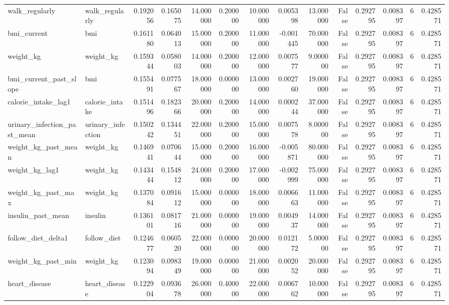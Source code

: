 \begin{longtable}{llrrrrrrrrrrrr}
walk\_regularly & walk\_regularly & 0.192056 & 0.165075 & 14.000000 & 0.200000 & 10.000000 & 0.005398 & 13.000000 & False & 0.292795 & 0.008397 & 6 & 0.428571 \\
bmi\_current & bmi & 0.161180 & 0.064013 & 15.000000 & 0.200000 & 11.000000 & -0.001445 & 70.000000 & False & 0.292795 & 0.008397 & 6 & 0.428571 \\
weight\_kg & weight\_kg & 0.159344 & 0.058003 & 14.000000 & 0.200000 & 12.000000 & 0.007577 & 9.000000 & False & 0.292795 & 0.008397 & 6 & 0.428571 \\
bmi\_current\_past\_slope & bmi & 0.155491 & 0.077567 & 18.000000 & 0.000000 & 13.000000 & 0.002760 & 19.000000 & False & 0.292795 & 0.008397 & 6 & 0.428571 \\
calorie\_intake\_lag1 & calorie\_intake & 0.151496 & 0.182366 & 20.000000 & 0.200000 & 14.000000 & 0.000244 & 37.000000 & False & 0.292795 & 0.008397 & 6 & 0.428571 \\
urinary\_infection\_past\_mean & urinary\_infection & 0.150242 & 0.134451 & 22.000000 & 0.200000 & 15.000000 & 0.007578 & 8.000000 & False & 0.292795 & 0.008397 & 6 & 0.428571 \\
weight\_kg\_past\_mean & weight\_kg & 0.146941 & 0.070644 & 15.000000 & 0.200000 & 16.000000 & -0.005871 & 80.000000 & False & 0.292795 & 0.008397 & 6 & 0.428571 \\
weight\_kg\_lag1 & weight\_kg & 0.143444 & 0.154812 & 24.000000 & 0.200000 & 17.000000 & -0.002999 & 75.000000 & False & 0.292795 & 0.008397 & 6 & 0.428571 \\
weight\_kg\_past\_max & weight\_kg & 0.137084 & 0.091612 & 15.000000 & 0.000000 & 18.000000 & 0.006663 & 11.000000 & False & 0.292795 & 0.008397 & 6 & 0.428571 \\
insulin\_past\_mean & insulin & 0.136101 & 0.081716 & 21.000000 & 0.000000 & 19.000000 & 0.004937 & 14.000000 & False & 0.292795 & 0.008397 & 6 & 0.428571 \\
follow\_diet\_delta1 & follow\_diet & 0.124677 & 0.060520 & 22.000000 & 0.000000 & 20.000000 & 0.012172 & 5.000000 & False & 0.292795 & 0.008397 & 6 & 0.428571 \\
weight\_kg\_past\_min & weight\_kg & 0.123094 & 0.098349 & 19.000000 & 0.000000 & 21.000000 & 0.002052 & 20.000000 & False & 0.292795 & 0.008397 & 6 & 0.428571 \\
heart\_disease & heart\_disease & 0.122904 & 0.093678 & 26.000000 & 0.400000 & 22.000000 & 0.006762 & 10.000000 & False & 0.292795 & 0.008397 & 6 & 0.428571 \\

\end{longtable}
